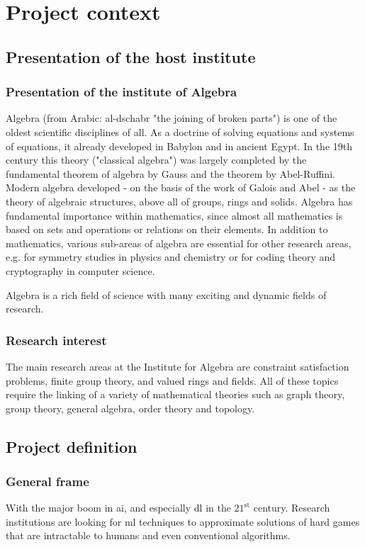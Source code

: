 \chapter{Project context}

\section{Presentation of the host institute}
\subsection{Presentation of the institute of Algebra}
Algebra (from Arabic: al-dschabr "the joining of broken parts") is one of the oldest scientific disciplines of all. As a doctrine of solving equations and systems of equations, it already developed in Babylon and in ancient Egypt. In the 19th century this theory ("classical algebra") was largely completed by the fundamental theorem of algebra by Gauss and the theorem by Abel-Ruffini. Modern algebra developed - on the basis of the work of Galois and Abel - as the theory of algebraic structures, above all of groups, rings and solids. Algebra has fundamental importance within mathematics, since almost all mathematics is based on sets and operations or relations on their elements. In addition to mathematics, various sub-areas of algebra are essential for other research areas, e.g. for symmetry studies in physics and chemistry or for coding theory and cryptography in computer science.

Algebra is a rich field of science with many exciting and dynamic fields of research.


\subsection{Research interest}
The main research areas at the Institute for Algebra are constraint satisfaction problems, finite group theory, and valued rings and fields. All of these topics require the linking of a variety of mathematical theories such as graph theory, group theory, general algebra, order theory and topology.


\section{Project definition}
\subsection{General frame}
With the major boom in \acrlong{ai}, and especially \acrlong{dl} in the $21^\text{st}$ century. Research institutions are looking for \acrlong{ml} techniques to approximate solutions of hard games that are intractable to humans and even conventional algorithms.

